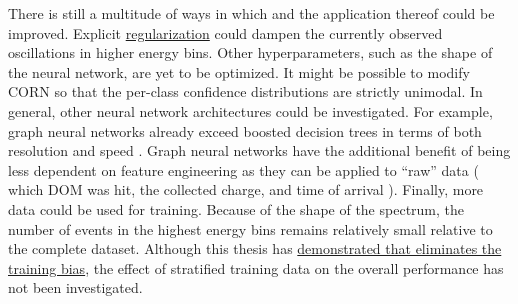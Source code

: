 There is still a multitude of ways in which \dsea{} and the application thereof could be improved.
%
Explicit \hyperref[sec:dsea:deconvolution_problem:regularization]{regularization}
could dampen the currently observed oscillations in higher energy bins.
%
Other hyperparameters,
  such as the shape of the neural network,
are yet to be optimized.
%
It might be possible to modify \ac{CORN}
  so that the per-class confidence distributions are strictly unimodal.
In general,
other neural network architectures
  could be investigated.
For example,
  graph neural networks
  already exceed boosted decision trees
    in terms of both resolution and speed \cite{minh2021gnn}.
%
Graph neural networks
have the additional benefit of
being less dependent on feature engineering
  as they can be applied to \enquote{raw} data
    (%
      which \ac{DOM} was hit,
      the collected charge, %
      and time of arrival%
    ).
%
Finally,
  more data could be used for training.
Because of the shape of the spectrum,
  the number of events in the highest energy bins
  remains relatively small
    relative to the complete dataset.
Although this thesis has \hyperref[sec:unfolding:bias]{demonstrated that \dsea{} eliminates the training bias},
  the effect of stratified training data on the overall performance
  has not been investigated.


